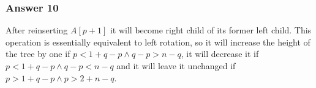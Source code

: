 \documentclass[11pt]{article}
\begin{document}
\subsubsection{Answer 10}
\label{sec-1-4-2}
After reinserting $A[p + 1]$ it will become right child of its former left
child.  This operation is essentially equivalent to left rotation, so it
will increase the height of the tree by one if $p < 1 + q - p \land q - p >
    n - q$, it will decrease it if $p < 1 + q - p \land q - p < n - q$ and it
will leave it unchanged if $p > 1 + q - p \land p > 2 + n - q$.
\end{document}
